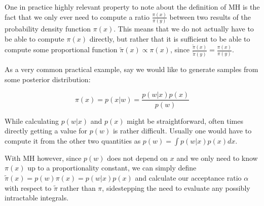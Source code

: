 One in practice highly relevant property to note about the definition of MH is the fact that we only ever need to compute a ratio $\frac{\pi(x)}{\pi(y)}$ between two results of the probability density function $\pi(x)$. This means that we do not actually have to be able to compute $\pi(x)$ directly, but rather that it is sufficient to be able to compute some proportional function $\tilde{\pi}(x) \propto \pi(x)$, since $\frac{\tilde{\pi}(x)}{\tilde{\pi}(y)} = \frac{\pi(x)}{\pi(y)}$.

As a very common practical example, say we would like to generate samples from some posterior distribution:

\begin{equation*}
\pi(x) = p(x | w) = \frac{p(w | x) p(x)}{p(w)}
\end{equation*}

While calculating $p(w | x)$ and $p(x)$ might be straightforward, often times directly getting a value for $p(w)$ is rather difficult. Usually one would have to compute it from the other two quantities as $p(w) = \int p(w | x) p(x) dx$.

With MH however, since $p(w)$ does not depend on $x$ and we only need to know $\pi(x)$ up to a proportionality constant, we can simply define $\tilde{\pi}(x) = p(w) \pi(x) = p(w | x) p(x)$ and calculate our acceptance ratio $\alpha$ with respect to $\tilde{\pi}$ rather than $\pi$, sidestepping the need to evaluate any possibly intractable integrals.
